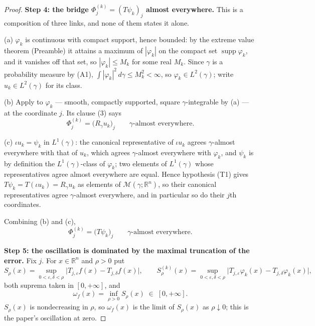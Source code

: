 \begin{proof}
\medskip
\noindent\textbf{Step 4: the bridge $\Phi^{(k)}_j = (T\psi_k)_j$ almost
everywhere.}
This is a composition of three links, and none of them states it alone.

(a) $\varphi_k$ is continuous with compact support, hence bounded: by the
extreme value theorem (Preamble) it attains a maximum of $|\varphi_k|$ on the
compact set $\operatorname{supp}\varphi_k$, and it vanishes off that set, so
$|\varphi_k| \leq M_k$ for some real $M_k$.  Since $\gamma$ is a probability
measure by (A1), $\int|\varphi_k|^2\,d\gamma \leq M_k^2 < \infty$, so
$\varphi_k \in L^2(\gamma)$; write $u_k \in L^2(\gamma)$ for its class.

(b) Apply  to $\varphi_k$ --- smooth,
compactly supported, square $\gamma$-integrable by (a) --- at the coordinate
$j$.  Its clause (3) says
\begin{equation}\label{eq:pvid-link2}
  \Phi^{(k)}_j = \bigl(R_\gamma u_k\bigr)_j
  \qquad \gamma\text{-almost everywhere} .
\end{equation}

(c) $\iota u_k = \psi_k$ in $L^1(\gamma)$: the canonical representative of
$\iota u_k$ agrees $\gamma$-almost everywhere with that of $u_k$, which agrees
$\gamma$-almost everywhere with $\varphi_k$, and $\psi_k$ is by definition the
$L^1(\gamma)$-class of $\varphi_k$; two elements of $L^1(\gamma)$ whose
representatives agree almost everywhere are equal.  Hence hypothesis (T1)
gives $T\psi_k = T(\iota u_k) = R_\gamma u_k$ as elements of
$\mathcal{M}(\gamma;\mathbb{R}^n)$, so their canonical representatives agree
$\gamma$-almost everywhere, and in particular so do their $j$th coordinates.

Combining (b) and (c),
\begin{equation}\label{eq:pvid-bridge}
  \Phi^{(k)}_j = \bigl(T\psi_k\bigr)_j
  \qquad \gamma\text{-almost everywhere} .
\end{equation}

\medskip
\noindent\textbf{Step 5: the oscillation is dominated by the maximal
truncation of the error.}
Fix $j$.  For $x \in \mathbb{R}^n$ and $\rho > 0$ put
\[
  S_\rho(x) = \sup_{0<\varepsilon,\delta<\rho}
     \bigl|T_{j,\varepsilon}f(x) - T_{j,\delta}f(x)\bigr| ,
  \qquad
  S^{(k)}_\rho(x) = \sup_{0<\varepsilon,\delta<\rho}
     \bigl|T_{j,\varepsilon}\varphi_k(x) - T_{j,\delta}\varphi_k(x)\bigr| ,
\]
both suprema taken in $[0,+\infty]$, and
\[
  \omega_f(x) = \inf_{\rho>0}S_\rho(x) \;\in\;[0,+\infty] .
\]
$S_\rho(x)$ is nondecreasing in $\rho$, so $\omega_f(x)$ is the limit of
$S_\rho(x)$ as $\rho \downarrow 0$; this is the paper's oscillation at zero.


\end{proof}
